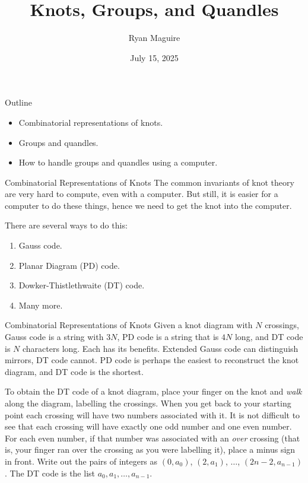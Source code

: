 \documentclass{beamer}
\title{Knots, Groups, and Quandles}
\author{Ryan Maguire}
\date{July 15, 2025}
\begin{document}
    \maketitle
    \begin{frame}{Outline}
        \begin{itemize}
            \item Combinatorial representations of knots.
            \item Groups and quandles.
            \item How to handle groups and quandles using a computer.
        \end{itemize}
    \end{frame}
    \begin{frame}{Combinatorial Representations of Knots}
        The common invariants of knot theory are very hard to compute, even
        with a computer. But still, it is easier for a computer to do these
        things, hence we need to get the knot into the computer.
        \par\hfill\par
        There are several ways to do this:
        \begin{enumerate}
            \item
                Gauss code.
            \item
                Planar Diagram (PD) code.
            \item
                Dowker-Thistlethwaite (DT) code.
            \item
                Many more.
        \end{enumerate}
    \end{frame}
    \begin{frame}{Combinatorial Representations of Knots}
        Given a knot diagram with $N$ crossings, Gauss code is a string with $3N$,
        PD code is a string that is $4N$ long, and DT code is $N$ characters long.
        Each has its benefits. Extended Gauss code can distinguish mirrors,
        DT code cannot.
        PD code is perhaps the easiest to
        reconstruct the knot diagram, and DT code is the shortest.
        \par\hfill\par
        To obtain the DT code of
        a knot diagram, place your finger on the knot and \textit{walk} along
        the diagram, labelling the crossings. When you get back to your starting
        point each crossing will have two numbers associated with it. It is
        not difficult to see that each crossing will have exactly one odd number
        and one even number. For each even number, if that number was associated
        with an \textit{over} crossing (that is, your finger ran over the
        crossing as you were labelling it), place a minus sign in front. Write
        out the pairs of integers as $(0,a_{0})$, $(2,a_{1})$, $\dots$,
        $(2n-2,a_{n-1})$. The DT code is the list $a_{0},a_{1},\dots,a_{n-1}$.
    \end{frame}
\end{document}
